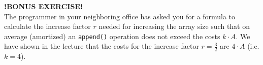   \textbf{!BONUS EXERCISE!}\\
The programmer in your neighboring office has asked you for a formula to
calculate the increase factor $r$ needed for increasing the array size such
that on average (amortized) an \texttt{append()} operation does not exceed the
costs $k \cdot A$.
We have shown in the lecture that the costs for the increase factor
$r = \frac{3}{2}$ are $4 \cdot A$ (i.e. $k = 4$).
